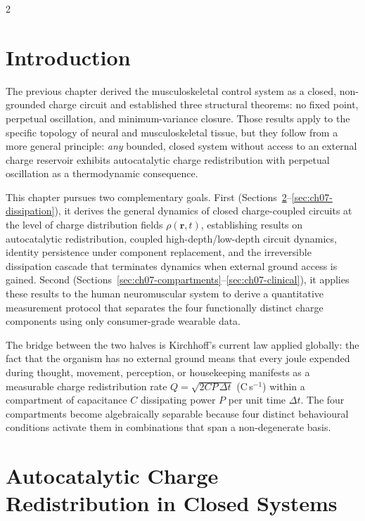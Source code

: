 \begin{multicols}{2}

\section{Introduction}
\label{sec:ch07-introduction}

The previous chapter derived the musculoskeletal control system as a closed,
non-grounded charge circuit and established three structural theorems: no
fixed point, perpetual oscillation, and minimum-variance closure.  Those
results apply to the specific topology of neural and musculoskeletal tissue,
but they follow from a more general principle: \emph{any} bounded, closed
system without access to an external charge reservoir exhibits autocatalytic
charge redistribution with perpetual oscillation as a thermodynamic
consequence.

This chapter pursues two complementary goals.  First
(Sections~\ref{sec:ch07-autocatalytic}--\ref{sec:ch07-dissipation}), it
derives the general dynamics of closed charge-coupled circuits at the level of
charge distribution fields $\rho(\mathbf{r},t)$, establishing results on
autocatalytic redistribution, coupled high-depth/low-depth circuit dynamics,
identity persistence under component replacement, and the irreversible
dissipation cascade that terminates dynamics when external ground access is
gained.  Second (Sections~\ref{sec:ch07-compartments}--\ref{sec:ch07-clinical}),
it applies these results to the human neuromuscular system to derive a
quantitative measurement protocol that separates the four functionally
distinct charge components using only consumer-grade wearable data.

The bridge between the two halves is Kirchhoff's current law applied globally:
the fact that the organism has no external ground means that every joule
expended during thought, movement, perception, or housekeeping manifests as a
measurable charge redistribution rate $Q = \sqrt{2CP\,\Delta t}$ (C\,s$^{-1}$)
within a compartment of capacitance $C$ dissipating power $P$ per unit time
$\Delta t$.  The four compartments become algebraically separable because four
distinct behavioural conditions activate them in combinations that span a
non-degenerate basis.

\section{Autocatalytic Charge Redistribution in Closed Systems}
\label{sec:ch07-autocatalytic}


\end{multicols}
